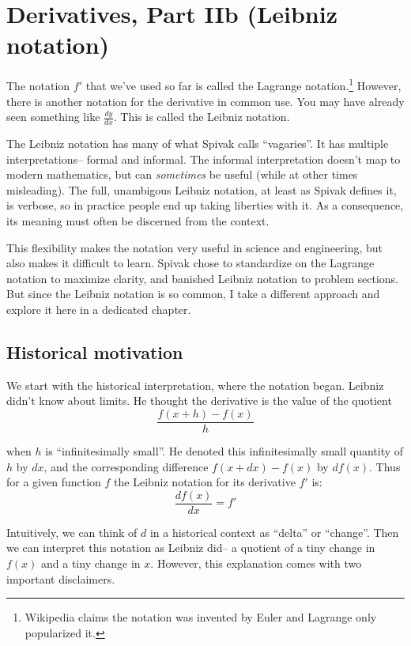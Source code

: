 
\section{Derivatives, Part IIb (Leibniz notation)}

The notation $f'$ that we've used so far is called the Lagrange
notation.\footnote{Wikipedia claims the notation was invented by Euler
  and Lagrange only popularized it.} However, there is another
notation for the derivative in common use. You may have already seen
something like $\frac{dy}{dx}$. This is called the Leibniz notation.

\vs

The Leibniz notation has many of what Spivak calls ``vagaries''. It
has multiple interpretations-- formal and informal. The informal
interpretation doesn't map to modern mathematics, but can
\textit{sometimes} be useful (while at other times misleading). The
full, unambigous Leibniz notation, at least as Spivak defines it, is
verbose, so in practice people end up taking liberties with it. As a
consequence, its meaning must often be discerned from the context.

\vs

This flexibility makes the notation very useful in science and
engineering, but also makes it difficult to learn. Spivak chose to
standardize on the Lagrange notation to maximize clarity, and banished
Leibniz notation to problem sections. But since the Leibniz notation
is so common, I take a different approach and explore it here in a
dedicated chapter.

\subsection{Historical motivation}

We start with the historical interpretation, where the notation began.
Leibniz didn't know about limits. He thought the derivative is the
value of the quotient
\[\frac{f(x+h)-f(x)}{h}\]

when $h$ is ``infinitesimally small''. He denoted this infinitesimally
small quantity of $h$ by $dx$, and the corresponding difference
$f(x+dx)-f(x)$ by $df(x)$. Thus for a given function $f$ the Leibniz
notation for its derivative $f'$ is:
\[\frac{df(x)}{dx}=f'\]

Intuitively, we can think of $d$ in a historical context as ``delta''
or ``change''. Then we can interpret this notation as Leibniz did-- a
quotient of a tiny change in $f(x)$ and a tiny change in $x$. However,
this explanation comes with two important disclaimers.

